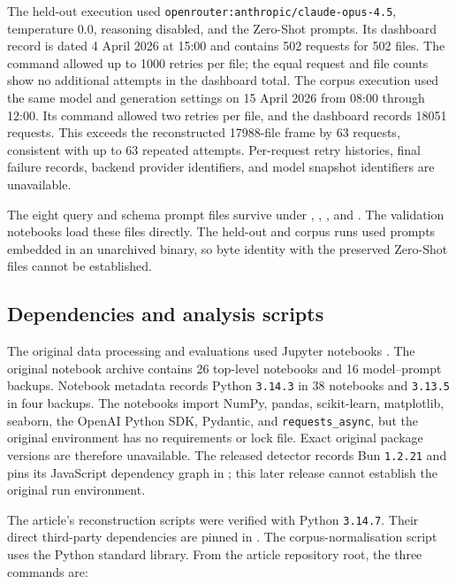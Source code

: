 \documentclass[a4paper,11pt]{article}
\begin{document}
The held-out execution used \texttt{openrouter:anthropic/claude-opus-4.5}, temperature \num{0.0}, reasoning disabled, and the Zero-Shot prompts. Its dashboard record is dated 4 April 2026 at 15:00 and contains \num{502} requests for \num{502} files. The command allowed up to \num{1000} retries per file; the equal request and file counts show no additional attempts in the dashboard total. The corpus execution used the same model and generation settings on 15 April 2026 from 08:00 through 12:00. Its command allowed two retries per file, and the dashboard records \num{18051} requests. This exceeds the reconstructed \num{17988}-file frame by \num{63} requests, consistent with up to \num{63} repeated attempts. Per-request retry histories, final failure records, backend provider identifiers, and model snapshot identifiers are unavailable.

The eight query and schema prompt files survive under , , , and . The validation notebooks load these files directly. The held-out and corpus runs used prompts embedded in an unarchived binary, so byte identity with the preserved Zero-Shot files cannot be established.

\subsection{Dependencies and analysis scripts}

The original data processing and evaluations used Jupyter notebooks \citep{jupyterHomepage}. The original notebook archive contains 26 top-level notebooks and 16 model--prompt backups. Notebook metadata records Python \texttt{3.14.3} in 38 notebooks and \texttt{3.13.5} in four backups. The notebooks import NumPy, pandas, scikit-learn, matplotlib, seaborn, the OpenAI Python SDK, Pydantic, and \texttt{requests\_async}, but the original environment has no requirements or lock file. Exact original package versions are therefore unavailable. The released detector records Bun \texttt{1.2.21} and pins its JavaScript dependency graph in ; this later release cannot establish the original run environment.

The article's reconstruction scripts were verified with Python \texttt{3.14.7}. Their direct third-party dependencies are pinned in . The corpus-normalisation script uses the Python standard library. From the article repository root, the three commands are:
\end{document}
